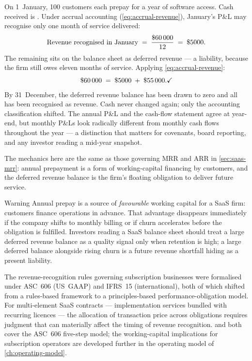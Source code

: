 \begin{example}
On 1~January, \num{100} customers each prepay  for a year of software access.
Cash received is . Under accrual accounting (\cref{eq:accrual-revenue}),
January's P\&L may recognise only one month of service delivered:
\[
  \text{Revenue recognised in January} \;=\; \frac{\$\num{60000}}{12} \;=\; \$\num{5000}.
\]
The remaining  sits on the balance sheet as deferred revenue --- a liability,
because the firm still owes eleven months of service. Applying \cref{eq:accrual-revenue}:
\[
  \$\num{60000} \;=\; \$\num{5000} \;+\; \$\num{55000}. \checkmark
\]
By 31~December, the deferred revenue balance has been drawn to zero and all  has
been recognised as revenue. Cash never changed again; only the accounting classification
shifted. The annual P\&L and the cash-flow statement agree at year-end, but monthly P\&Ls
look radically different from monthly cash flows throughout the year --- a distinction that
matters for covenants, board reporting, and any investor reading a mid-year snapshot.

The mechanics here are the same as those governing MRR and ARR in \cref{sec:saas-mrr}:
annual prepayment is a form of working-capital financing by customers, and the deferred
revenue balance is the firm's floating obligation to deliver future service.
\end{example}

\begin{admonition}{Warning}
Annual prepay is a source of \emph{favourable} working capital for a SaaS firm: customers
finance operations in advance. That advantage disappears immediately if the company shifts to
monthly billing or if churn accelerates before the obligation is fulfilled. Investors reading
a SaaS balance sheet should treat a large deferred revenue balance as a quality signal only
when retention is high; a large deferred balance alongside rising churn is a future revenue
shortfall hiding as a present liability.
\end{admonition}

The revenue-recognition rules governing subscription businesses were formalised under ASC~606
(US~GAAP) and IFRS~15 (international), both of which shifted from a rules-based framework to
a principles-based performance-obligation model. For multi-element SaaS contracts ---
implementation services bundled with recurring licences --- the allocation of transaction
price across obligations requires judgment that can materially affect the timing of revenue
recognition. \textcite{weygandt2019financial} and \textcite{libby2022financial} both cover
the ASC~606 five-step model; the working-capital implications for subscription operators are
developed further in the operating model of \cref{ch:operating-model}.

